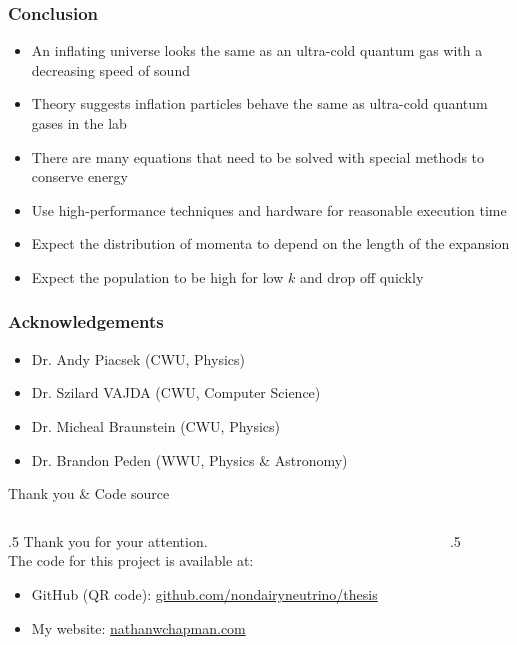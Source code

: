 \documentclass[aspectratio=169]{beamer}
\begin{document}
\begin{frame}
    \frametitle{Conclusion}
    \begin{itemize}
        \item <1->An inflating universe looks the same as an ultra-cold quantum gas with a decreasing speed of sound
        \item <2->Theory suggests inflation particles behave the same as ultra-cold quantum gases in the lab
        \item <3->There are many equations that need to be solved with special methods to conserve energy
        \item <4->Use high-performance techniques and hardware for reasonable execution time
        \item <5->Expect the distribution of momenta to depend on the length of the expansion
        \item <6->Expect the population to be high for low $k$ and drop off quickly
    \end{itemize}
\end{frame}

\begin{frame}
    \frametitle{Acknowledgements}

    \begin{itemize}
        \item Dr. Andy Piacsek (CWU, Physics)
        \item Dr. Szilard VAJDA (CWU, Computer Science)
        \item Dr. Micheal Braunstein (CWU, Physics)
        \item Dr. Brandon Peden (WWU, Physics \& Astronomy)
    \end{itemize}

\end{frame}

\begin{frame}{Thank you \& Code source}
    \begin{columns}[onlytextwidth]
        \begin{column}{.5\textwidth}
            Thank you for your attention.
            \vspace*{0.1\textheight} \\
            The code for this project is available at:
            \begin{itemize}
                \item GitHub (QR code): \url{github.com/nondairyneutrino/thesis}
                \item My website: \url{nathanwchapman.com}
            \end{itemize}
        \end{column}
        \begin{column}{.5\textwidth}
            \centering
        \end{column}
    \end{columns}
    \end{frame}

\end{document}
